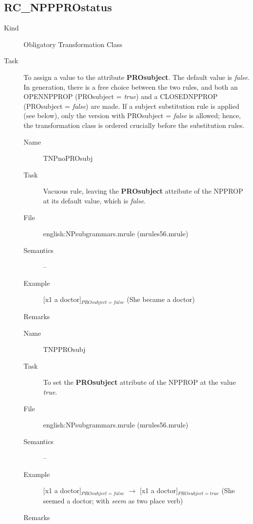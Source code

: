 \subsection{RC\_NPPPROstatus}
\begin{description}
\item[Kind] Obligatory Transformation Class
\item[Task] To assign a value to the attribute {\bf PROsubject}. The default 
value is 
{\em false\/}. In generation, there is a free choice between the two rules, and 
both an OPENNPPROP (PROsubject = {\em true\/}) and a CLOSEDNPPROP (PROsubject = 
{\em false\/}) are made. If a subject substitution rule is applied (see 
below), only the version with PROsubject = {\em false\/} is allowed; hence, the 
transformation class is ordered crucially before the substitution rules.

\vspace{1 cm}
\begin{description}
\item[Name] TNPnoPROsubj
\item[Task] Vacuous rule, leaving the {\bf PROsubject} attribute of the NPPROP 
at its default value, which is {\em false\/}.
\item[File] english:NPsubgrammars.mrule (mrules56.mrule)
\item[Semantics] --
\item[Example] [x1 a doctor]$_{PROsubject=false}$ (She became a doctor)
\item[Remarks]
\end{description}

\vspace{1 cm}
\begin{description}
\item[Name] TNPPROsubj
\item[Task] To set the {\bf PROsubject} attribute of the NPPROP 
at the value {\em true\/}.
\item[File] english:NPsubgrammars.mrule (mrules56.mrule)
\item[Semantics] --
\item[Example] [x1 a doctor]$_{PROsubject=false}$ $\rightarrow$ 
[x1 a doctor]$_{PROsubject=true}$ (She seemed a doctor; with {\em seem\/} as 
two place verb)
\item[Remarks]
\end{description}

\end{description}

\newpage

